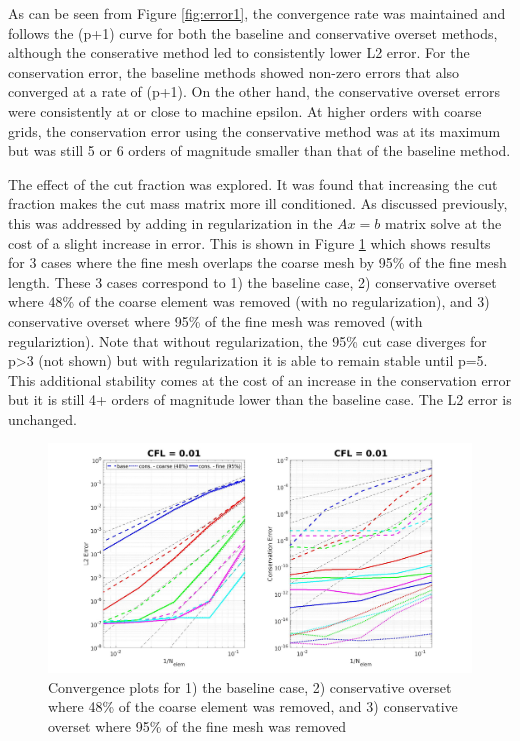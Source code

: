 \documentclass[11pt]{article}
\begin{document}
As can be seen from Figure \ref{fig:error1}, the convergence rate was maintained and 
follows the (p+1) curve for both the baseline and conservative overset methods, although
the conserative method led to consistently lower L2 error. For the conservation error, 
the baseline methods showed non-zero errors that also converged at a rate of (p+1). On
the other hand, the conservative overset errors were consistently at or close to machine epsilon. 
At higher orders with coarse grids, the conservation error using the conservative method was at
its maximum but was still 5 or 6 orders of magnitude smaller than that of the baseline method. 

The effect of the cut fraction was explored. It was found that increasing the cut fraction
makes the cut mass matrix more ill conditioned. As discussed previously, this was addressed
by adding in regularization in the $Ax=b$ matrix solve at the cost of a slight increase
in error. This is shown in Figure \ref{fig:reg} which shows results for 3 cases
where the fine mesh overlaps the coarse mesh by 95\% of the fine mesh length. These 3
cases correspond to 1) the baseline case, 2) conservative overset where 48\% of the coarse element 
was removed (with no regularization), and 3) conservative overset where 95\% of the fine mesh was removed (with
regulariztion). Note that without regularization, the 95\% cut case diverges for p>3 (not shown) but with regularization it is able to 
remain stable until p=5. This additional stability comes at the cost of an increase in the conservation
error but it is still 4+ orders of magnitude lower than the baseline case. The L2 error is unchanged. 
    
\begin{figure}
\centering
  \includegraphics[width=\textwidth]{Figures/Convergence_Legendre_CFL0p01_CutLength.jpg}
  \caption{Convergence plots for 1) the baseline case, 2) conservative overset where 48\% of the coarse element was removed, and 3) conservative overset where 95\% of the fine mesh was removed}
  \label{fig:reg}
\end{figure}
\end{document}
